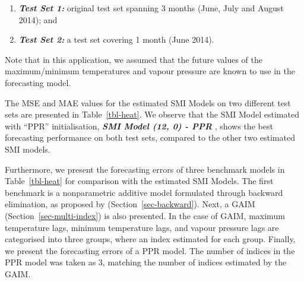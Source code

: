 \documentclass[
  11pt,
  a4paper,
]{article}
\providecommand{\tightlist}{%
  \setlength{\itemsep}{0pt}\setlength{\parskip}{0pt}}\usepackage{longtable,booktabs,array}
\begin{document}
\begin{enumerate}
\def\labelenumi{\arabic{enumi}.}
\tightlist
\item
  \textbf{\emph{Test Set 1:}} original test set spanning 3 months (June,
  July and August 2014); and
\item
  \textbf{\emph{Test Set 2:}} a test set covering 1 month (June 2014).
\end{enumerate}

Note that in this application, we assumed that the future values of the
maximum/minimum temperatures and vapour pressure are known to use in the
forecasting model.

The MSE and MAE values for the estimated SMI Models on two different
test sets are presented in Table~\ref{tbl-heat}. We observe that the SMI
Model estimated with ``PPR'' initialisation, \textbf{\emph{SMI Model
(12, 0) - PPR }}, shows the best forecasting performance on both test
sets, compared to the other two estimated SMI models.

Furthermore, we present the forecasting errors of three benchmark models
in Table~\ref{tbl-heat} for comparison with the estimated SMI Models.
The first benchmark is a nonparametric additive model formulated through
backward elimination, as proposed by \textcite{FH2012}
(Section~\ref{sec-backward}). Next, a GAIM
(Section~\ref{sec-multi-index}) is also presented. In the case of GAIM,
maximum temperature lags, minimum temperature lags, and vapour pressure
lags are categorised into three groups, where an index estimated for
each group. Finally, we present the forecasting errors of a PPR model.
The number of indices in the PPR model was taken as 3, matching the
number of indices estimated by the GAIM.
\end{document}
